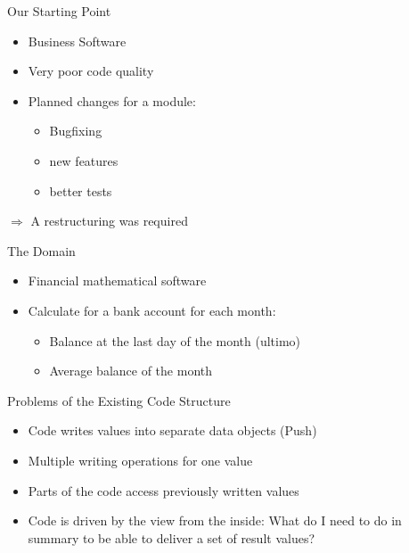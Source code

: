 
\begin{frame}[fragile]{Our Starting Point}
\begin{itemize}
\item Business Software
\item Very poor code quality
\item Planned changes for a module:
\begin{itemize}
\item Bugfixing
\item new features
\item better tests
\end{itemize}
\end{itemize}

$\Rightarrow$ A restructuring was required
\end{frame}

\begin{frame}[fragile]{The Domain}
\begin{itemize}
\item Financial mathematical software
\end{itemize}

\begin{itemize}
\item Calculate for a bank account for each month:
\begin{itemize}
\item Balance at the last day of the month (ultimo)
\item Average balance of the month
\end{itemize}
\end{itemize}

\end{frame}


\begin{frame}[fragile]{Problems of the Existing Code Structure}
\begin{itemize}
\item Code writes values into separate data objects (\glqq Push\grqq{})
\item Multiple writing operations for one value
\item Parts of  the code access previously written values
\item Code is driven by the view from the inside: What do I need to do in summary to be able to deliver a set of result values?
\end{itemize}
\end{frame}

